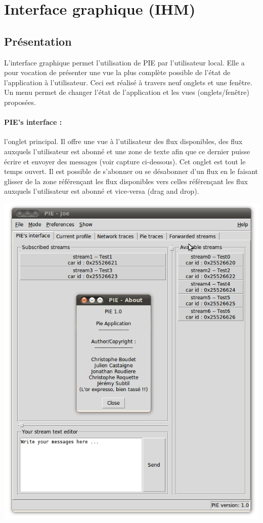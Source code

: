 
\section{Interface graphique (IHM)}
\label{section:ihm}

\subsection{Présentation}

L'interface graphique permet l'utilisation de PIE par l'utilisateur local. Elle a pour vocation
de présenter une vue la plus complète possible de l'état de l'application à l'utilisateur. Ceci
est réalisé à travers neuf onglets et une fenêtre. Un menu permet de changer l'état de l'application
et les vues (onglets/fenêtre) proposées.


\paragraph{PIE's interface :}
l'onglet principal. Il offre une vue à l'utilisateur des flux disponibles,
des flux auxquels l'utilisateur est abonné et une zone de texte afin que ce dernier puisse écrire et
envoyer des messages (voir capture ci-dessous). Cet onglet est tout le temps ouvert. Il est possible
de s'abonner ou se désabonner d'un flux en le faisant glisser de la zone référençant les flux disponibles
vers celles référençant les flux auxquels l'utilisateur est abonné et vice-versa (drag and drop).

\begin{center}
    \includegraphics[scale=0.5]{img/pie-main.png}
\end{center}

